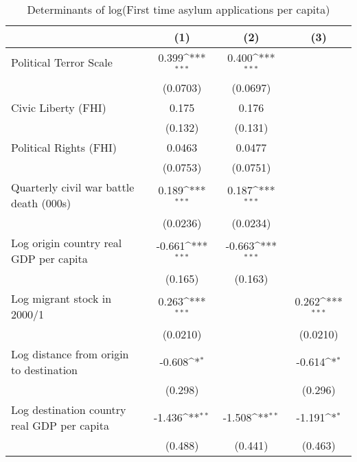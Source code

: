 \begin{table}[htbp]\centering
\def\sym#1{\ifmmode^{#1}\else\(^{#1}\)\fi}
\caption{Determinants of log(First time asylum applications per capita)}
\begin{tabular}{l*{3}{c}}
\hline\hline
                    &\multicolumn{1}{c}{(1)}         &\multicolumn{1}{c}{(2)}         &\multicolumn{1}{c}{(3)}         \\
\hline
Political Terror Scale&       0.399\sym{***}&       0.400\sym{***}&                     \\
                    &    (0.0703)         &    (0.0697)         &                     \\
[1em]
Civic Liberty (FHI) &       0.175         &       0.176         &                     \\
                    &     (0.132)         &     (0.131)         &                     \\
[1em]
Political Rights (FHI)&      0.0463         &      0.0477         &                     \\
                    &    (0.0753)         &    (0.0751)         &                     \\
[1em]
Quarterly civil war battle death (000s)&       0.189\sym{***}&       0.187\sym{***}&                     \\
                    &    (0.0236)         &    (0.0234)         &                     \\
[1em]
Log origin country real GDP per capita&      -0.661\sym{***}&      -0.663\sym{***}&                     \\
                    &     (0.165)         &     (0.163)         &                     \\
[1em]
Log migrant stock in 2000/1&       0.263\sym{***}&                     &       0.262\sym{***}\\
                    &    (0.0210)         &                     &    (0.0210)         \\
[1em]
Log distance from origin to destination&      -0.608\sym{*}  &                     &      -0.614\sym{*}  \\
                    &     (0.298)         &                     &     (0.296)         \\
[1em]
Log destination country real GDP per capita&      -1.436\sym{**} &      -1.508\sym{**} &      -1.191\sym{*}  \\
                    &     (0.488)         &     (0.441)         &     (0.463)         \\

\end{tabular}
\end{table}
